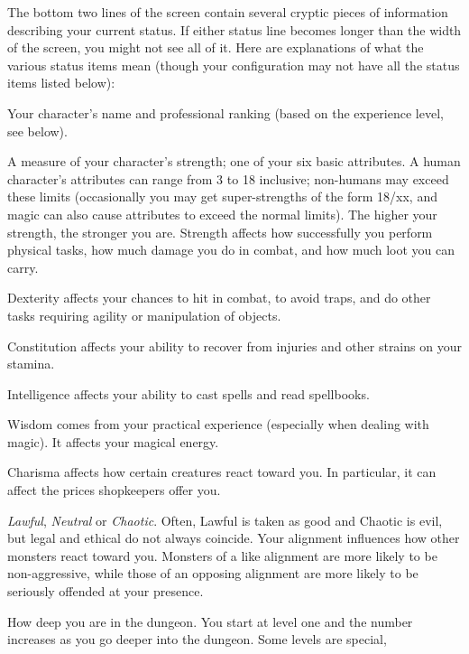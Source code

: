 The bottom two lines of the screen contain several cryptic pieces of
information describing your current status.  If either status line
becomes longer than the width of the screen, you might not see all of
it.  Here are explanations of what the various status items mean
(though your configuration may not have all the status items listed
below):

\blist{}
\item[\bb{Rank}]
Your character's name and professional ranking (based on the
experience level, see below).
\item[\bb{Strength}]
A measure of your character's strength; one of your six basic
attributes.  A human character's attributes can range from 3 to 18 inclusive;
non-humans may exceed these limits
(occasionally you may get super-strengths of the form 18/xx, and magic can
also cause attributes to exceed the normal limits).  The
higher your strength, the stronger you are.  Strength affects how
successfully you perform physical tasks, how much damage you do in
combat, and how much loot you can carry.
\item[\bb{Dexterity}]
Dexterity affects your chances to hit in combat, to avoid traps, and
do other tasks requiring agility or manipulation of objects.
\item[\bb{Constitution}]
Constitution affects your ability to recover from injuries and other
strains on your stamina.
\item[\bb{Intelligence}]
Intelligence affects your ability to cast spells and read spellbooks.
\item[\bb{Wisdom}]
Wisdom comes from your practical experience (especially when dealing with
magic).  It affects your magical energy.
\item[\bb{Charisma}]
Charisma affects how certain creatures react toward you.  In
particular, it can affect the prices shopkeepers offer you.
\item[\bb{Alignment}]
%
{\it Lawful}, {\it Neutral\/} or {\it Chaotic}.  Often, Lawful is
taken as good and Chaotic is evil, but legal and ethical do not always
coincide.  Your alignment influences how other
monsters react toward you.  Monsters of a like alignment are more likely
to be non-aggressive, while those of an opposing alignment are more likely
to be seriously offended at your presence.
\item[\bb{Dungeon Level}]
How deep you are in the dungeon.  You start at level one and the number
increases as you go deeper into the dungeon.  Some levels are special,
